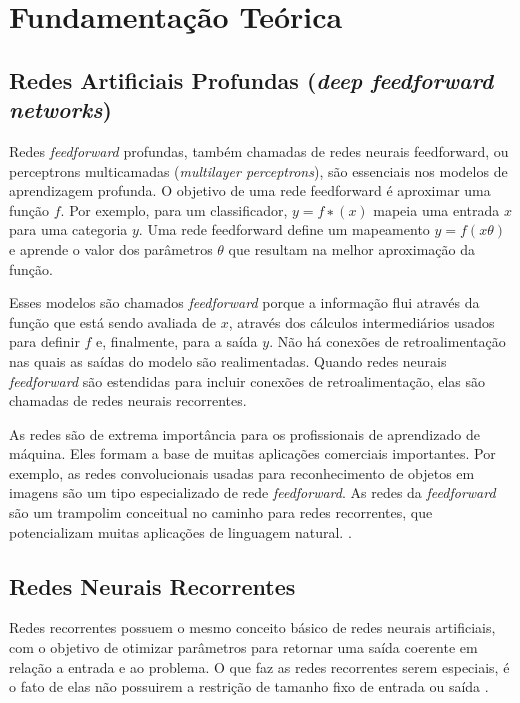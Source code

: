 \documentclass[12pt]{article}
\begin{document}
\section{Fundamentação Teórica} \label{sec:revisao}
\subsection{Redes Artificiais Profundas (\textit{deep feedforward networks})}

Redes \textit{feedforward} profundas, também chamadas de redes neurais feedforward, ou perceptrons multicamadas (\textit{multilayer perceptrons}), são essenciais nos modelos de aprendizagem profunda. O objetivo de uma rede feedforward é aproximar uma função $f$. Por exemplo, para um classificador, $y = f ∗ (x)$ mapeia uma entrada $x$ para uma categoria $y$. Uma rede feedforward define um mapeamento $y = f (x θ)$ e aprende o valor dos parâmetros $θ$ que resultam na melhor aproximação da função.

Esses modelos são chamados \textit{feedforward} porque a informação flui através da função que está sendo avaliada de $x$, através dos cálculos intermediários usados ​​para definir $f$ e, finalmente, para a saída $y$. Não há conexões de retroalimentação nas quais as saídas do modelo são realimentadas. Quando redes neurais \textit{feedforward} são estendidas para incluir conexões de retroalimentação, elas são chamadas de redes neurais recorrentes.

As redes  são de extrema importância para os profissionais de aprendizado de máquina. Eles formam a base de muitas aplicações comerciais importantes. Por exemplo, as redes convolucionais usadas para reconhecimento de objetos em imagens são um tipo especializado de rede \textit{feedforward}. As redes da \textit{feedforward} são um trampolim conceitual no caminho para redes recorrentes, que potencializam muitas aplicações de linguagem natural. \cite{Goodfellow-et-al-2016}.

\subsection{Redes Neurais Recorrentes}

Redes recorrentes possuem o mesmo conceito básico de redes neurais artificiais, com o objetivo de otimizar parâmetros para retornar uma saída coerente em relação a entrada e ao problema. O que faz as redes recorrentes serem especiais, é o fato de elas não possuirem a restrição de tamanho fixo de entrada ou saída \cite{karpathy:2015}.
\end{document}
